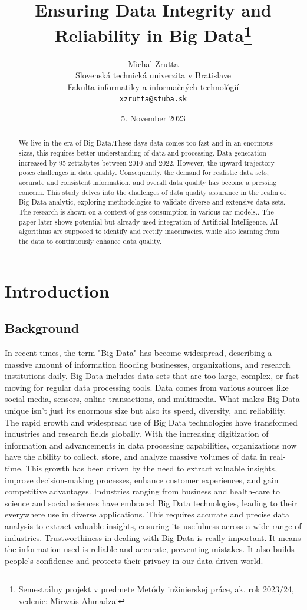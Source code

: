 \documentclass[10pt,a4paper]{article}
\title{Ensuring Data Integrity and Reliability in Big Data\thanks{Semestrálny projekt v predmete Metódy inžinierskej práce, ak. rok 2023/24, vedenie: Mirwais Ahmadzai}}
\author{Michal Zrutta \\[2pt]
	{\small Slovenská technická univerzita v Bratislave}\\
	{\small Fakulta informatiky a informačných technológií}\\
	{\small \texttt{xzrutta@stuba.sk}}
}
\date{\small 5. November 2023}
\begin{document}
\maketitle

\begin{abstract}
We live in the era of Big Data.These days data comes too fast and in an enormous sizes, this requires better understanding of data and processing. Data generation increased by 95 zettabytes between 2010 and 2022.\cite{gudivada2015big}
However, the upward trajectory poses challenges in data 
quality. Consequently, the demand for realistic data sets, accurate and consistent information, and overall data quality has become a pressing concern.\cite{gudivada2015big}
This study delves into the challenges of data quality assurance in the realm of Big Data analytic, exploring methodologies to validate diverse and extensive data-sets. The research is shown on a context of gas consumption in various car models.\cite{mittal2013trustworthiness}.
The paper later shows potential but already used integration of Artificial Intelligence. AI algorithms are supposed to identify and rectify inaccuracies, while also learning from the data to continuously enhance data quality.
\end{abstract}
\section{Introduction}
\subsection{Background}
In recent times, the term "Big Data" has become widespread, describing a massive amount of information flooding businesses, organizations, and research institutions daily. Big Data includes data-sets that are too large, complex, or fast-moving for regular data processing tools. Data comes from various sources like social media, sensors, online transactions, and multimedia. What makes Big Data unique isn't just its enormous size but also its speed, diversity, and reliability.\cite{gudivada2015big}
The rapid growth and widespread use of Big Data technologies have transformed industries and research fields globally. With the increasing digitization of information and advancements in data processing capabilities, organizations now have the ability to collect, store, and analyze massive volumes of data in real-time. This growth has been driven by the need to extract valuable insights, improve decision-making processes, enhance customer experiences, and gain competitive advantages. Industries ranging from business and health-care to science and social sciences have embraced Big Data technologies, leading to their everywhere use in diverse applications.\cite{anisetti2023assurance}
This requires accurate and precise data analysis to extract valuable insights, ensuring its usefulness across a wide range of industries. Trustworthiness in dealing with Big Data is really important. It means the information used is reliable and accurate, preventing mistakes. It also builds people's confidence and protects their privacy in our data-driven world.\cite{anisetti2023assurance}
\end{document}
